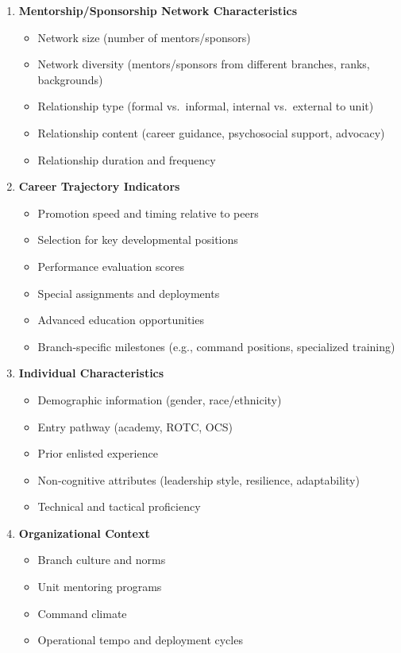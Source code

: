 \documentclass[
  letterpaper,
  DIV=11,
  numbers=noendperiod]{scrartcl}
\providecommand{\tightlist}{%
  \setlength{\itemsep}{0pt}\setlength{\parskip}{0pt}}
\begin{document}
\begin{enumerate}
\def\labelenumi{\arabic{enumi}.}
\tightlist
\item
  \textbf{Mentorship/Sponsorship Network Characteristics}

  \begin{itemize}
  \tightlist
  \item
    Network size (number of mentors/sponsors)
  \item
    Network diversity (mentors/sponsors from different branches, ranks,
    backgrounds)
  \item
    Relationship type (formal vs.~informal, internal vs.~external to
    unit)
  \item
    Relationship content (career guidance, psychosocial support,
    advocacy)
  \item
    Relationship duration and frequency
  \end{itemize}
\item
  \textbf{Career Trajectory Indicators}

  \begin{itemize}
  \tightlist
  \item
    Promotion speed and timing relative to peers
  \item
    Selection for key developmental positions
  \item
    Performance evaluation scores
  \item
    Special assignments and deployments
  \item
    Advanced education opportunities
  \item
    Branch-specific milestones (e.g., command positions, specialized
    training)
  \end{itemize}
\item
  \textbf{Individual Characteristics}

  \begin{itemize}
  \tightlist
  \item
    Demographic information (gender, race/ethnicity)
  \item
    Entry pathway (academy, ROTC, OCS)
  \item
    Prior enlisted experience
  \item
    Non-cognitive attributes (leadership style, resilience,
    adaptability)
  \item
    Technical and tactical proficiency
  \end{itemize}
\item
  \textbf{Organizational Context}

  \begin{itemize}
  \tightlist
  \item
    Branch culture and norms
  \item
    Unit mentoring programs
  \item
    Command climate
  \item
    Operational tempo and deployment cycles
  \end{itemize}
\end{enumerate}
\end{document}
